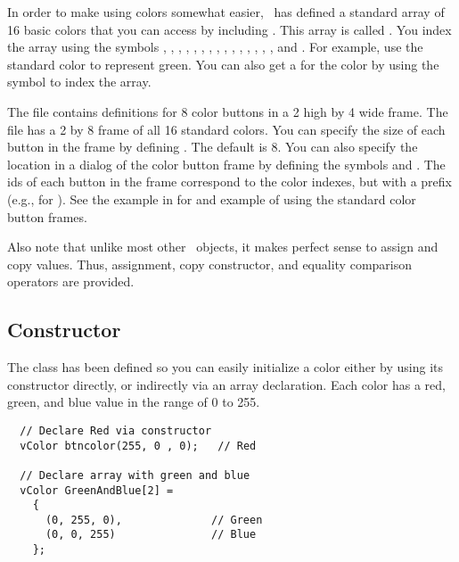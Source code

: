 In order to make using colors somewhat easier, \V\ has defined
a standard array of 16 basic colors that you can
access by including . This array is called
. You index the array using the symbols ,
, , , ,
, , ,
, , ,
, , ,
, and . For example, use the standard color
 to represent green. You can also get a
 for the color by using the symbol to index the
 array.

The file  contains definitions for
8 color buttons in a 2 high by 4 wide frame. The file
 has a 2 by 8 frame of all 16 standard colors.
You can specify the size of each button in the frame by
defining . The default is 8. You can also specify
the location in a dialog of the color button frame by defining
the symbols  and .
The ids of each button in the frame correspond to the color
indexes, but with a  prefix (e.g.,  for
). See the example in  for and example
of using the standard color button frames.

Also note that unlike most other \V\ objects, it makes perfect
sense to assign and copy  values. Thus, assignment,
copy constructor, and equality comparison operators are provided.

\subsection* {Constructor} %


The class has been defined so you can easily initialize a color
either by using its constructor directly, or indirectly via an
array declaration. Each color has a red, green, and blue value in
the range of 0 to 255.

\footnotesize
\begin{verbatim}
  // Declare Red via constructor
  vColor btncolor(255, 0 , 0);   // Red

  // Declare array with green and blue
  vColor GreenAndBlue[2] =
    {
      (0, 255, 0),              // Green
      (0, 0, 255)               // Blue
    };
\end{verbatim}
\normalfont\normalsize

